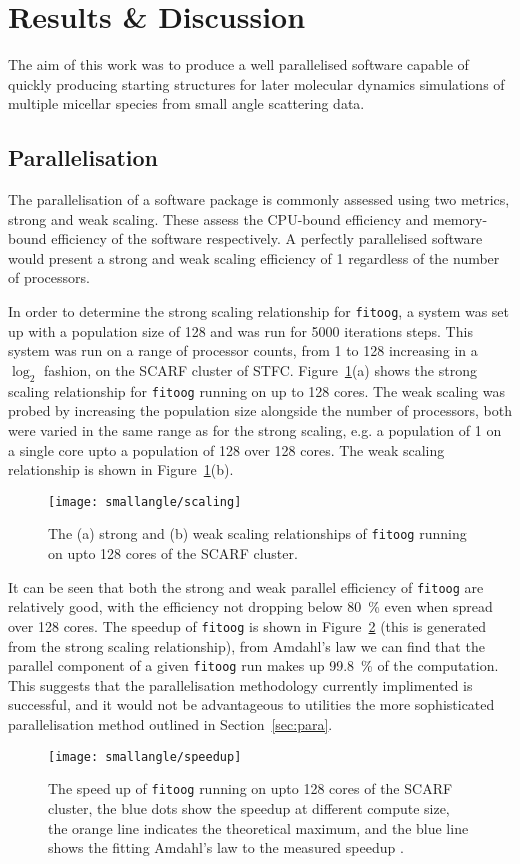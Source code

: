 \section{Results \& Discussion}
The aim of this work was to produce a well parallelised software capable of quickly producing starting structures for later molecular dynamics simulations of multiple micellar species from small angle scattering data.

\subsection{Parallelisation}
The parallelisation of a software package is commonly assessed using two metrics, strong and weak scaling.
These assess the CPU-bound efficiency and memory-bound efficiency of the software respectively.
A perfectly parallelised software would present a strong and weak scaling efficiency of 1 regardless of the number of processors.

In order to determine the strong scaling relationship for \texttt{fitoog}, a system was set up with a population size of 128 and was run for 5000 iterations steps.
This system was run on a range of processor counts, from 1 to 128 increasing in a $\log_2$ fashion, on the SCARF cluster of STFC.
Figure~\ref{fig:scale}(a) shows the strong scaling relationship for \texttt{fitoog} running on up to 128 cores.
The weak scaling was probed by increasing the population size alongside the number of processors, both were varied in the same range as for the strong scaling, e.g. a population of 1 on a single core upto a population of 128 over 128 cores.
The weak scaling relationship is shown in Figure~\ref{fig:scale}(b).
%
\begin{figure}
    \centering
    \texttt{[image: smallangle/scaling]}
    \caption{The (a) strong and (b) weak scaling relationships of \texttt{fitoog} running on upto 128 cores of the SCARF cluster.}
    \label{fig:scale}
\end{figure}
%

It can be seen that both the strong and weak parallel efficiency of \texttt{fitoog} are relatively good, with the efficiency not dropping below \SI{80}{\percent} even when spread over 128 cores.
The speedup of \texttt{fitoog} is shown in Figure~\ref{fig:speedup} (this is generated from the strong scaling relationship), from Amdahl's law \cite{amdahl_validity_1967} we can find that the parallel component of a given \texttt{fitoog} run makes up \SI{99.8}{\percent} of the computation.
This suggests that the parallelisation methodology currently implimented is successful, and it would not be advantageous to utilities the more sophisticated parallelisation method outlined in Section~\ref{sec:para}.
%
\begin{figure}
    \centering
    \texttt{[image: smallangle/speedup]}
    \caption{The speed up of \texttt{fitoog} running on upto 128 cores of the SCARF cluster, the blue dots show the speedup at different compute size, the orange line indicates the theoretical maximum, and the blue line shows the fitting Amdahl's law to the measured speedup \cite{amdahl_validity_1967}.}
    \label{fig:speedup}
\end{figure}
%

